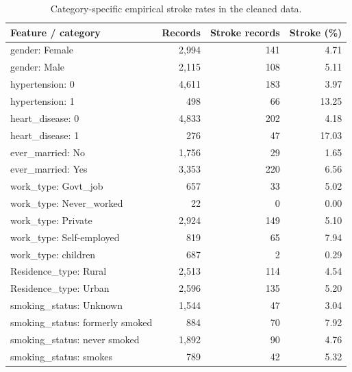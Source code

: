 \documentclass[12pt, a4paper]{article}
\begin{document}
\begin{table}[htbp]
\centering\small
\setlength{\tabcolsep}{4pt}\renewcommand{\arraystretch}{1.12}
\caption{Category-specific empirical stroke rates in the cleaned data.}
\label{tab:stroke-rates}
\begin{tabular}{p{.48\linewidth}rrr}
\toprule
\raggedright \textbf{Feature / category} & \textbf{Records} & \textbf{Stroke records} & \textbf{Stroke (\%)} \tabularnewline
\midrule
\raggedright gender: Female & 2,994 & 141 & 4.71 \tabularnewline
\raggedright gender: Male & 2,115 & 108 & 5.11 \tabularnewline
\raggedright hypertension: 0 & 4,611 & 183 & 3.97 \tabularnewline
\raggedright hypertension: 1 & 498 & 66 & 13.25 \tabularnewline
\raggedright heart\_disease: 0 & 4,833 & 202 & 4.18 \tabularnewline
\raggedright heart\_disease: 1 & 276 & 47 & 17.03 \tabularnewline
\raggedright ever\_married: No & 1,756 & 29 & 1.65 \tabularnewline
\raggedright ever\_married: Yes & 3,353 & 220 & 6.56 \tabularnewline
\raggedright work\_type: Govt\_job & 657 & 33 & 5.02 \tabularnewline
\raggedright work\_type: Never\_worked & 22 & 0 & 0.00 \tabularnewline
\raggedright work\_type: Private & 2,924 & 149 & 5.10 \tabularnewline
\raggedright work\_type: Self-employed & 819 & 65 & 7.94 \tabularnewline
\raggedright work\_type: children & 687 & 2 & 0.29 \tabularnewline
\raggedright Residence\_type: Rural & 2,513 & 114 & 4.54 \tabularnewline
\raggedright Residence\_type: Urban & 2,596 & 135 & 5.20 \tabularnewline
\raggedright smoking\_status: Unknown & 1,544 & 47 & 3.04 \tabularnewline
\raggedright smoking\_status: formerly smoked & 884 & 70 & 7.92 \tabularnewline
\raggedright smoking\_status: never smoked & 1,892 & 90 & 4.76 \tabularnewline
\raggedright smoking\_status: smokes & 789 & 42 & 5.32 \tabularnewline
\bottomrule
\end{tabular}
\end{table}
\end{document}
